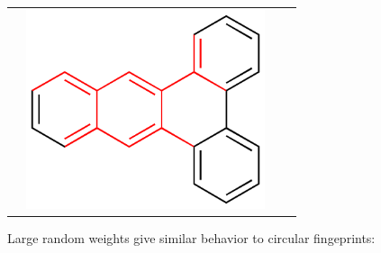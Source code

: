 \documentclass[landscape,a0b,final,a4resizeable]{include/a0poster}
\begin{document}
\begin{poster}
\begin{multicols}{3}
\begin{center}
\begin{tabular}{>{\centering}m{\mywidthb} >{\centering}m{\mywidtha} >{\centering}m{\mywidtha} >{\centering\arraybackslash}m{\mywidtha}}
& \includegraphics[width=7cm]{figures/jorge-figures/12.png}\\
\end{tabular}
\end{center}






\newpage %



Large random weights give similar behavior to circular fingeprints:
\vspace{0.5em}


\end{multicols}
\end{poster}
\end{document}
